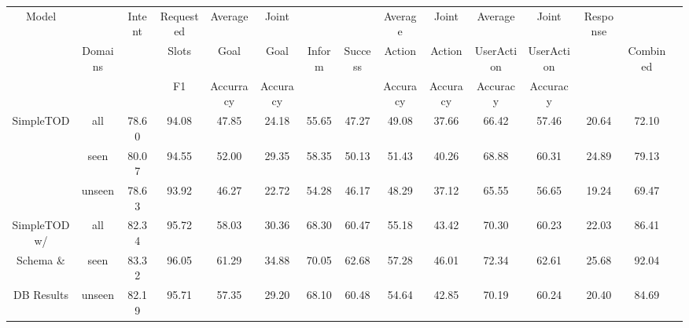 \begin{table*}
    \centering
    \begin{adjustbox}{max width=\textwidth}
        \begin{tabular}{|c|c|c|c|c|c|c|c|c|c|c|c|c|c|c|}
            \hline
            \multirow{3}{*}{Model}     &         & \multirow{2}{*}{Intent}   & Requested & Average        & Joint          &                &         & Average  & Joint    & Average    & Joint      & \multirow{2}{*}{Response} &          \\
                                       & Domains & \multirow{2}{*}{Accuracy} & Slots     & Goal           & Goal           & Inform         & Success & Action   & Action   & UserAction & UserAction & \multirow{2}{*}{GLEU}     & Combined \\
                                       &         &                           & F1        & Accurracy      & Accuracy       &                &         & Accuracy & Accuracy & Accuracy   & Accuracy   &                           &          \\ \hline
            \multirow{3}{*}{SimpleTOD} & all     & 78.60                     & 94.08     & 47.85          & 24.18          & 55.65          & 47.27   & 49.08    & 37.66    & 66.42      & 57.46      & 20.64                     & 72.10    \\
                                       & seen    & 80.07                     & 94.55     & 52.00          & 29.35          & 58.35          & 50.13   & 51.43    & 40.26    & 68.88      & 60.31      & 24.89                     & 79.13    \\
                                       & unseen  & 78.63                     & 93.92     & 46.27          & 22.72          & 54.28          & 46.17   & 48.29    & 37.12    & 65.55      & 56.65      & 19.24                     & 69.47    \\ \hline
            {SimpleTOD w/}             & all     & 82.34                     & 95.72     & 58.03          & 30.36          & 68.30          & 60.47   & 55.18    & 43.42    & 70.30      & 60.23      & 22.03                     & 86.41    \\
            {Schema \&}                & seen    & 83.32                     & 96.05     & 61.29          & 34.88          & 70.05          & 62.68   & 57.28    & 46.01    & 72.34      & 62.61      & 25.68                     & 92.04    \\
            {DB Results}               & unseen  & 82.19                     & 95.71     & 57.35          & 29.20          & 68.10          & 60.48   & 54.64    & 42.85    & 70.19      & 60.24      & 20.40                     & 84.69    \\ \hline

\end{tabular}
\end{adjustbox}
\end{table*}
